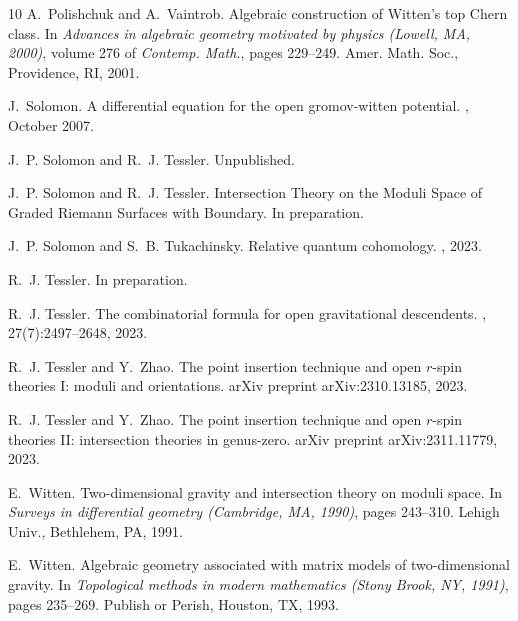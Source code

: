 \documentclass[11pt]{amsart}
\theoremstyle{definition}
\theoremstyle{remark}
\newcommand{\<}{\left<}
\renewcommand{\>}{\right>}
\numberwithin{equation}{section}
\begin{document}
\begin{thebibliography}{10}
A.~Polishchuk and A.~Vaintrob.
\newblock Algebraic construction of {W}itten's top {C}hern class.
\newblock In {\em Advances in algebraic geometry motivated by physics
  ({L}owell, {MA}, 2000)}, volume 276 of {\em Contemp. Math.}, pages 229--249.
  Amer. Math. Soc., Providence, RI, 2001.

J.~Solomon.
\newblock A differential equation for the open gromov-witten potential.
, October 2007.

J.~P. Solomon and R.~J. Tessler.
\newblock Unpublished.

J.~P. Solomon and R.~J. Tessler.
\newblock Intersection {T}heory on the {M}oduli {S}pace of {G}raded {R}iemann
  {S}urfaces with {B}oundary.
\newblock In preparation.

J.~P. Solomon and S.~B. Tukachinsky.
\newblock Relative quantum cohomology.
, 2023.

R.~J. Tessler.
\newblock In preparation.

R.~J. Tessler.
\newblock The combinatorial formula for open gravitational descendents.
, 27(7):2497--2648, 2023.

R.~J. Tessler and Y.~Zhao.
\newblock The point insertion technique and open $r$-spin theories {I}: moduli
  and orientations.
\newblock arXiv preprint arXiv:2310.13185, 2023.

R.~J. Tessler and Y.~Zhao.
\newblock The point insertion technique and open $r$-spin theories {II}:
  intersection theories in genus-zero.
\newblock arXiv preprint arXiv:2311.11779, 2023.

E.~Witten.
\newblock Two-dimensional gravity and intersection theory on moduli space.
\newblock In {\em Surveys in differential geometry ({C}ambridge, {MA}, 1990)},
  pages 243--310. Lehigh Univ., Bethlehem, PA, 1991.

E.~Witten.
\newblock Algebraic geometry associated with matrix models of two-dimensional
  gravity.
\newblock In {\em Topological methods in modern mathematics ({S}tony {B}rook,
  {NY}, 1991)}, pages 235--269. Publish or Perish, Houston, TX, 1993.
\end{thebibliography}
\end{document}
